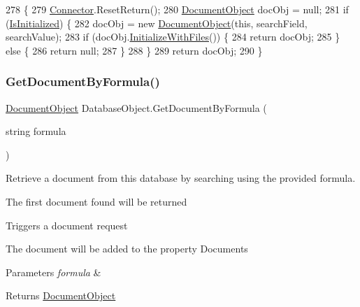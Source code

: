 \begin{DoxyCode}
278                                                                                            \{
279         \mbox{\hyperlink{class_connector}{Connector}}.ResetReturn();
280         \mbox{\hyperlink{class_document_object}{DocumentObject}} docObj = null;
281         \textcolor{keywordflow}{if} (\mbox{\hyperlink{class_database_object_a5fe036d32a30eb10d1b3f6a30263f740}{IsInitialized}}) \{
282             docObj = \textcolor{keyword}{new} \mbox{\hyperlink{class_document_object}{DocumentObject}}(\textcolor{keyword}{this}, searchField, searchValue);
283             \textcolor{keywordflow}{if} (docObj.\mbox{\hyperlink{class_document_object_a83f0e855adc5fb7afd02d2e34767f5c8}{InitializeWithFiles}}()) \{
284                 \textcolor{keywordflow}{return} docObj;
285             \} \textcolor{keywordflow}{else} \{
286                 \textcolor{keywordflow}{return} null;
287             \}
288         \}
289         \textcolor{keywordflow}{return} docObj;
290     \}
\end{DoxyCode}
\mbox{\label{class_database_object_ae5477aedfcd0d54b21017faa1389bc71}} 
\subsubsection{\texorpdfstring{Get\+Document\+By\+Formula()}{GetDocumentByFormula()}}
{\footnotesize\ttfamily \mbox{\hyperlink{class_document_object}{Document\+Object}} Database\+Object.\+Get\+Document\+By\+Formula (\begin{DoxyParamCaption}\item[{string}]{formula }\end{DoxyParamCaption})}



Retrieve a document from this database by searching using the provided formula. 

The first document found will be returned

Triggers a document request

The document will be added to the property \textquotesingle{}Documents\textquotesingle{}


\begin{DoxyParams}{Parameters}
{\em formula} & \\
\hline
\end{DoxyParams}
\begin{DoxyReturn}{Returns}
\mbox{\hyperlink{class_document_object}{Document\+Object}}
\end{DoxyReturn}


